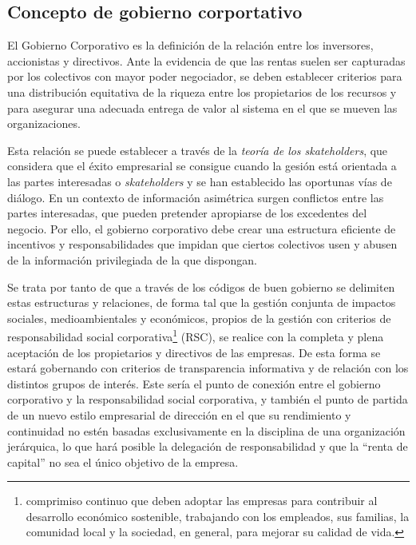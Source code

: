 \documentclass[12pt,a4paper,spanish]{report}
\begin{document}
		\subsection{\textcolor[rgb]{0.9,0.3,0.3}Concepto de gobierno corportativo}
			El Gobierno Corporativo es la definición de la relación entre los inversores, accionistas y directivos. Ante la evidencia de que las rentas suelen ser capturadas por los colectivos con mayor poder negociador, se deben establecer criterios para una distribución equitativa de la riqueza entre los propietarios de los recursos y para asegurar una adecuada entrega de valor al sistema en el que se mueven las organizaciones. 

			Esta relación se puede establecer a través de la \textcolor[rgb]{0.9,0.3,0.3}{\emph{teoría de los skateholders}}, que considera que el éxito empresarial se consigue cuando la gesión está orientada a las partes interesadas o \textcolor[rgb]{0.9,0.3,0.3}{\emph{skateholders}} y se han establecido las oportunas vías de diálogo. En un contexto de información asimétrica surgen conflictos entre las partes interesadas, que pueden pretender apropiarse de los excedentes del negocio. Por ello, el gobierno corporativo debe crear una estructura eficiente de incentivos y responsabilidades que impidan que ciertos colectivos usen y abusen de la información privilegiada de la que dispongan.

			Se trata por tanto de que a través de los códigos de buen gobierno se delimiten estas estructuras y relaciones, de forma tal que la gestión conjunta de impactos sociales, medioambientales y económicos, propios de la gestión con criterios de responsabilidad social corporativa\footnote{comprimiso continuo que deben adoptar las empresas para contribuir al desarrollo económico sostenible, trabajando con los empleados, sus familias, la comunidad local y la sociedad, en general, para mejorar su calidad de vida.} (RSC), se realice con la completa y plena aceptación de los propietarios y directivos de las empresas. De esta forma se estará gobernando con criterios de transparencia informativa y de relación con los distintos grupos de interés. Este sería el punto de conexión entre el gobierno corporativo y la responsabilidad social corporativa, y también el punto de partida de un nuevo estilo empresarial de dirección en el que su rendimiento y continuidad no estén basadas exclusivamente en la disciplina de una organización jerárquica, lo que hará posible la delegación de responsabilidad y que la ``renta de capital'' no sea el único objetivo de la empresa.
\end{document}
